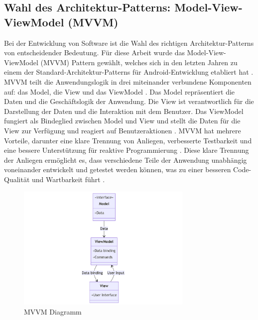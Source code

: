\subsection{Wahl des Architektur-Patterns: Model-View-ViewModel (MVVM)} \label{Wahl des Architektur-Pattern}
Bei der Entwicklung von Software ist die Wahl des richtigen Architektur-Patterns von entscheidender Bedeutung. Für diese Arbeit wurde das Model-View-ViewModel (MVVM) Pattern gewählt, welches sich in den letzten Jahren zu einem der Standard-Architektur-Patterns für Android-Entwicklung etabliert hat \cite{AndroidAppArchitecture}. \newline
MVVM teilt die Anwendungslogik in drei miteinander verbundene Komponenten auf: das Model, die View und das ViewModel \cite{MicrosoftMVVM2022}. Das Model repräsentiert die Daten und die Geschäftslogik der Anwendung. Die View ist verantwortlich für die Darstellung der Daten und die Interaktion mit dem Benutzer. Das ViewModel fungiert als Bindeglied zwischen Model und View und stellt die Daten für die View zur Verfügung und reagiert auf Benutzeraktionen \cite{AndroidAppArchitecture}. \newline
MVVM hat mehrere Vorteile, darunter eine klare Trennung von Anliegen, verbesserte Testbarkeit und eine bessere Unterstützung für reaktive Programmierung \cite{AndroidAppArchitecture}. Diese klare Trennung der Anliegen ermöglicht es, dass verschiedene Teile der Anwendung unabhängig voneinander entwickelt und getestet werden können, was zu einer besseren Code-Qualität und Wartbarkeit führt \cite{MicrosoftMVVM2022}. \newline
\begin{figure}[h]
    \centering
    \includegraphics[width=0.75\textwidth]{images/diagramme/MVVM.png}
    \caption{MVVM Diagramm}
    \label{fig:mvvm}
\end{figure}
    

